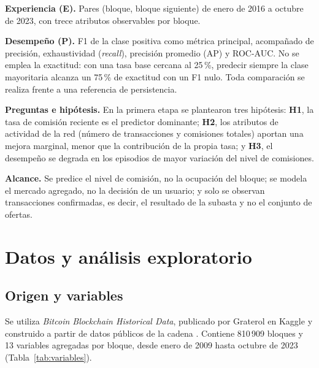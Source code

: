 \documentclass[conference]{IEEEtran}
\begin{document}
\textbf{Experiencia (E).} Pares (bloque, bloque siguiente) de enero de 2016 a octubre de 2023, con trece atributos observables por bloque.

\textbf{Desempeño (P).} F1 de la clase positiva como métrica principal, acompañado de precisión, exhaustividad (\textit{recall}), precisión promedio (AP) y ROC-AUC. No se emplea la exactitud: con una tasa base cercana al 25\,\%, predecir siempre la clase mayoritaria alcanza un 75\,\% de exactitud con un F1 nulo. Toda comparación se realiza frente a una referencia de persistencia.

\textbf{Preguntas e hipótesis.} En la primera etapa se plantearon tres hipótesis: \textbf{H1}, la tasa de comisión reciente es el predictor dominante; \textbf{H2}, los atributos de actividad de la red (número de transacciones y comisiones totales) aportan una mejora marginal, menor que la contribución de la propia tasa; y \textbf{H3}, el desempeño se degrada en los episodios de mayor variación del nivel de comisiones.

\textbf{Alcance.} Se predice el nivel de comisión, no la ocupación del bloque; se modela el mercado agregado, no la decisión de un usuario; y solo se observan transacciones confirmadas, es decir, el resultado de la subasta y no el conjunto de ofertas.

\section{Datos y análisis exploratorio}
\subsection{Origen y variables}
Se utiliza \textit{Bitcoin Blockchain Historical Data}, publicado por Graterol en Kaggle \cite{graterol_kaggle} y construido a partir de datos públicos de la cadena \cite{graterol_github}. Contiene 810\,909 bloques y 13 variables agregadas por bloque, desde enero de 2009 hasta octubre de 2023 (Tabla~\ref{tab:variables}).
\end{document}
